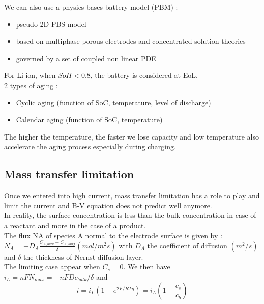 \documentclass[../main.tex]{subfiles}
\begin{document}
We can also use a physics bases battery model (PBM) : \begin{itemize}
    \item pseudo-2D PBS model
    \item based on multiphase porous electrodes and concentrated solution theories
    \item governed by a set of coupled non linear PDE
\end{itemize}

For Li-ion, when $SoH < 0.8$, the battery is considered at EoL. \\

2 types of aging : \begin{itemize}
    \item Cyclic aging (function of SoC, temperature, level of discharge)
    \item Calendar aging (function of SoC, temperature)
\end{itemize}

The higher the temperature, the faster we lose capacity and low temperature also accelerate the aging process especially during charging.\\

\subsection{Mass transfer limitation}
Once we entered into high current, mass transfer limitation has a role to play and limit the current and B-V equation does not predict well anymore.\\

In reality, the surface concentration is less than the bulk concentration in case of a reactant and more in the case of a product.\\
The flux NA of species A normal to the electrode surface is given by : $N_A = -D_A \frac{C_{A,bulk} - C_{A,surf}}{\delta} (mol/m^2s)$ with $D_A$ the coefficient of diffusion $(m^2/s)$ and 
$\delta$ the thickness of Nernst diffusion layer.\\

The limiting case appear when $C_{s} = 0$. We then have $i_L = n F N_{max} = -nFD c_{bulk} / \delta$ and \begin{equation}
    i = i_L (1- e^{2F/ RT\eta}) = i_L (1- \frac{c_s}{c_b})
\end{equation}
\end{document}
